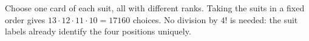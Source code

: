 Choose one card of each suit, all with different ranks. Taking the suits in a fixed order gives $13\cdot12\cdot11\cdot10=\boxed{17160}$ choices. No division by $4!$ is needed: the suit labels already identify the four positions uniquely.
